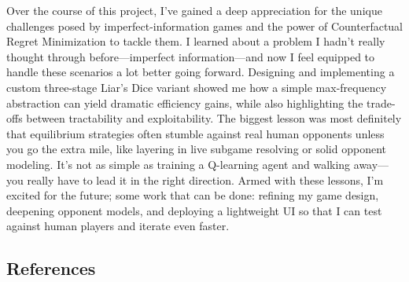\documentclass[
]{article}
\begin{document}
Over the course of this project, I've gained a deep appreciation for the
unique challenges posed by imperfect-information games and the power of
Counterfactual Regret Minimization to tackle them. I learned about a
problem I hadn't really thought through before---imperfect
information---and now I feel equipped to handle these scenarios a lot
better going forward. Designing and implementing a custom three-stage
Liar's Dice variant showed me how a simple max-frequency abstraction can
yield dramatic efficiency gains, while also highlighting the trade-offs
between tractability and exploitability. The biggest lesson was most
definitely that equilibrium strategies often stumble against real human
opponents unless you go the extra mile, like layering in live subgame
resolving or solid opponent modeling. It's not as simple as training a
Q-learning agent and walking away---you really have to lead it in the
right direction. Armed with these lessons, I'm excited for the future;
some work that can be done: refining my game design, deepening opponent
models, and deploying a lightweight UI so that I can test against human
players and iterate even faster.

\subsection{\texorpdfstring{\textbf{References}}{References}}\label{references}
\end{document}
